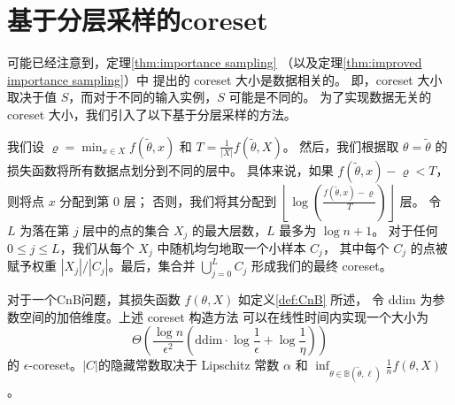 \section{基于分层采样的coreset}

可能已经注意到，定理\ref{thm:importance sampling} （以及定理\ref{thm:improved importance sampling}）中
提出的 coreset 大小是数据相关的。
即，coreset 大小取决于值 $S$，而对于不同的输入实例，$S$ 可能是不同的。
为了实现数据无关的 coreset 大小，我们引入了以下基于分层采样的方法。


我们设 $\varrho = \min_{x \in X} f(\tilde{\theta}, x)$ 和 $T = \frac{1}{|X|} f(\tilde{\theta}, X)$。
然后，我们根据取 $\theta=\tilde{\theta}$ 的损失函数将所有数据点划分到不同的层中。
具体来说，如果 $f(\tilde{\theta}, x) - \varrho < T$，则将点 $x$ 分配到第 0 层；
否则，我们将其分配到 $\left\lfloor \log \left( \frac{f(\tilde{\theta}, x) - \varrho}{T} \right) \right\rfloor$ 层。
令 $L$ 为落在第 $j$ 层中的点的集合 $X_j$ 的最大层数，$L$ 最多为 $\log n + 1$。
对于任何 $0 \leq j \leq L$，我们从每个 $X_j$ 中随机均匀地取一个小样本 $C_j$，
其中每个 $C_j$ 的点被赋予权重 $|X_j| / |C_j|$。最后，集合并 $\bigcup_{j=0}^{L} C_j$ 形成我们的最终 coreset。

\begin{theorem}
    对于一个CnB问题，其损失函数 $f(\theta, X)$ 如定义\ref{def:CnB} 所述，
    令 ddim 为参数空间的加倍维度。上述 coreset 构造方法
    可以在线性时间内实现一个大小为
    \begin{equation*}
    \Theta \left( \frac{\log n}{\epsilon^2} \left( \text{ddim} \cdot \log \frac{1}{\epsilon} + \log \frac{1}{\eta} \right) \right)
    \end{equation*}
    的 $\epsilon$-coreset。$|C|$的隐藏常数取决于 Lipschitz 常数 $\alpha$ 和 $\inf_{\theta \in \mathbb{B}(\tilde{\theta}, \ell)} \frac{1}{n} f(\theta, X)$。    
\end{theorem}

